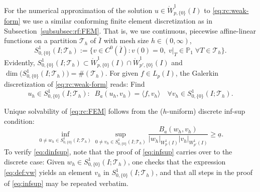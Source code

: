 \documentclass[reqno]{amsart}
\numberwithin{equation}{section}
\newcommand{\bbP}{\mathbb{P}}
\newcommand{\cT}{\mathcal{T}}
\newcommand{\seminorm}[2]{  | #1        |_{ #2 }}
\newcommand{\duality}[1]{     \langle #1       \rangle}
\newcommand{\Wo}{\mathring{W}}
\theoremstyle{remark}
\theoremstyle{definition}
\begin{document}
For the numerical approximation of the 
solution $u\in \Wo^1_{p,\{0\}}(I)$ to \eqref{eq:rc:weak-form}
we use a similar conforming finite element discretization 
as in Subsection~\ref{subsubsec:rf:FEM}. 
That is, we use  continuous, 
piecewise affine-linear
functions on a partition $\cT_h$ of $\overline{I}$
with mesh size $h\in(0,\infty)$, 
% 
\[ 
S^1_{0,\{0\}}(I;\cT_h) 
:= 
\bigl\{ v\in C^0(\overline{I})  : 
v(0)=0,  \; v|_T \in \bbP_1 \; \forall T\in \cT_h \bigr\}. 
\] 
%
Evidently, 
$S^1_{0,\{0\}}(I;\cT_h) \subset 
\Wo^1_{p,\{0\}}(I) \cap \Wo^1_{p'\!,\{0\}}(I)$ and 
$\dim\bigl( S^1_{0,\{0\}}(I;\cT_h) \bigr) = \#(\cT_h)$. 
%
For given ${f\in L_p(I)}$, 
the Galerkin discretization of \eqref{eq:rc:weak-form} reads: 
Find 
%
\begin{equation}\label{eq:rc:FEM} 
u_h \in S^1_{0,\{0\}}(I;\cT_h): 
\;\; 
B_a( u_h, v_h ) 
= 
\duality{ f,v_h } 
\quad 
\forall v_h\in S^1_{0,\{0\}}(I;\cT_h).
\end{equation}
%

Unique solvability of \eqref{eq:rc:FEM}
follows from the ($h$-uniform) 
discrete inf-sup condition: 
%
\begin{equation}\label{eq:dinfsup}
\inf_{ 0\neq w_h \in S^1_{0,\{0\}}(I;\cT_h) }
\sup_{ 0\neq v_h \in S^1_{0,\{0\}}(I;\cT_h) }
\frac{B_a(w_h,v_h)}{ 
	\seminorm{ w_h }{W^1_p(I)} \seminorm{ v_h }{W^1_{p'}(I)} }
\geq
\underline{a} . 
\end{equation}
%
To verify \eqref{eq:dinfsup}, 
note that the proof 
of \eqref{eq:infsup} carries over
to the discrete case: 
Given $w_h \in S^1_{0,\{0\}}(I;\cT_h)$, 
one checks that the 
expression \eqref{eq:def:vw} 
yields an element $v_h$ in $S^1_{0,\{0\}}(I;\cT_h)$,
and that 
all steps in the proof of \eqref{eq:infsup} 
may be repeated verbatim. 
\end{document}
